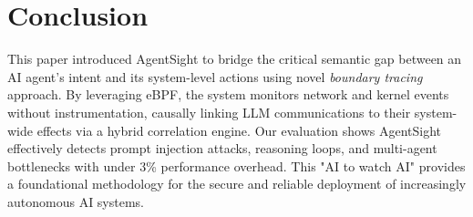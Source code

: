 

\section{Conclusion}

This paper introduced AgentSight to bridge the critical semantic gap between an AI agent's intent and its system-level actions using novel \textit{boundary tracing} approach. By leveraging eBPF, the system monitors network and kernel events without instrumentation, causally linking LLM communications to their system-wide effects via a hybrid correlation engine. Our evaluation shows AgentSight effectively detects prompt injection attacks, reasoning loops, and multi-agent bottlenecks with under 3\% performance overhead. This "AI to watch AI" provides a foundational methodology for the secure and reliable deployment of increasingly autonomous AI systems.






